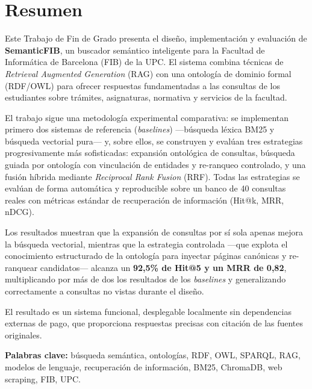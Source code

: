 \documentclass[12pt, a4paper, twoside]{report}
\begin{document}

\chapter*{Resumen}

Este Trabajo de Fin de Grado presenta el dise\~no, implementaci\'on y evaluaci\'on de \textbf{SemanticFIB}, un buscador sem\'antico inteligente para la Facultad de Inform\'atica de Barcelona (FIB) de la UPC. El sistema combina t\'ecnicas de \textit{Retrieval Augmented Generation} (RAG) con una ontolog\'ia de dominio formal (RDF/OWL) para ofrecer respuestas fundamentadas a las consultas de los estudiantes sobre tr\'amites, asignaturas, normativa y servicios de la facultad.

El trabajo sigue una metodolog\'ia experimental comparativa: se implementan primero dos sistemas de referencia (\textit{baselines}) ---b\'usqueda l\'exica BM25 y b\'usqueda vectorial pura--- y, sobre ellos, se construyen y eval\'uan tres estrategias progresivamente m\'as sofisticadas: expansi\'on ontol\'ogica de consultas, b\'usqueda guiada por ontolog\'ia con vinculaci\'on de entidades y re-ranqueo controlado, y una fusi\'on h\'ibrida mediante \textit{Reciprocal Rank Fusion} (RRF). Todas las estrategias se eval\'uan de forma autom\'atica y reproducible sobre un banco de 40 consultas reales con m\'etricas est\'andar de recuperaci\'on de informaci\'on (Hit@k, MRR, nDCG).

Los resultados muestran que la expansi\'on de consultas por s\'i sola apenas mejora la b\'usqueda vectorial, mientras que la estrategia controlada ---que explota el conocimiento estructurado de la ontolog\'ia para inyectar p\'aginas can\'onicas y re-ranquear candidatos--- alcanza un \textbf{92,5\% de Hit@5 y un MRR de 0,82}, multiplicando por m\'as de dos los resultados de los \textit{baselines} y generalizando correctamente a consultas no vistas durante el dise\~no.

El resultado es un sistema funcional, desplegable localmente sin dependencias externas de pago, que proporciona respuestas precisas con citaci\'on de las fuentes originales.

\textbf{Palabras clave:} b\'usqueda sem\'antica, ontolog\'ias, RDF, OWL, SPARQL, RAG, modelos de lenguaje, recuperaci\'on de informaci\'on, BM25, ChromaDB, web scraping, FIB, UPC.
\end{document}
